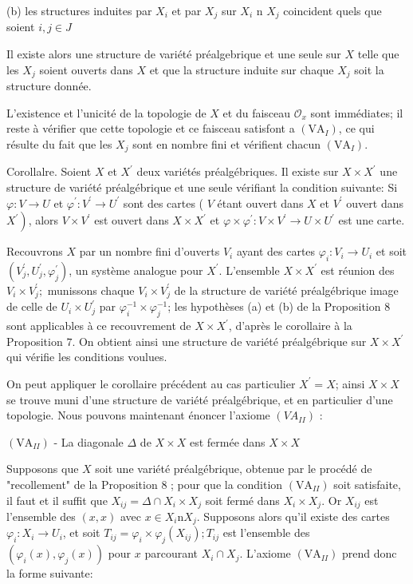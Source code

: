 (b) les structures induites par $X_{i}$ et par $X_{j}$ sur $X_{i}$ n $X_{j}$ coincident quels que soient $i, j \in J$

Il existe alors une structure de variété préalgebrique et une seule sur $X$ telle que les $X_{j}$ soient ouverts dans $X$ et que la structure induite sur chaque $X_{j}$ soit la structure donnée.

L'existence et l'unicité de la topologie de $X$ et du faisceau $\mathcal{O}_{x}$ sont immédiates; il reste à vérifier que cette topologie et ce faisceau satisfont a $\left(\mathrm{VA}_{I}\right)$, ce qui résulte du fait que les $X_{j}$ sont en nombre fini et vérifient chacun $\left(\mathrm{VA}_{I}\right)$.

Corollalre. Soient $X$ et $X^{\prime}$ deux variétés préalgébriques. Il existe sur $X \times X^{\prime}$ une structure de variété préalgébrique et une seule vérifiant la condition suivante: Si $\varphi: V \rightarrow U$ et $\varphi^{\prime}: V^{\prime} \rightarrow U^{\prime}$ sont des cartes ( $V$ étant ouvert dans $X$ et $V^{\prime}$ ouvert dans $\left.X^{\prime}\right)$, alors $V \times V^{\prime}$ est ouvert dans $X \times X^{\prime}$ et $\varphi \times \varphi^{\prime}: V \times V^{\prime} \rightarrow U \times U^{\prime}$ est une carte.

Recouvrons $X$ par un nombre fini d'ouverts $V_{i}$ ayant des cartes $\varphi_{i}: V_{i} \rightarrow U_{i}$ et soit $\left(V_{j}^{\prime}, U_{j}^{\prime}, \varphi_{j}^{\prime}\right)$, un système analogue pour $X^{\prime} .$ L'ensemble $X \times X^{\prime}$ est réunion des $V_{i} \times V_{j}^{\prime} ;$ munissons chaque $V_{i} \times V_{j}^{\prime}$ de la structure de variété préalgébrique image de celle de $U_{i} \times U_{j}^{\prime}$ par $\varphi_{i}^{-1} \times \varphi_{j}^{-1}$; les hypothèses (a) et (b) de la Proposition 8 sont applicables à ce recouvrement de $X \times X^{\prime}$, d'après le corollaire à la Proposition $7 .$ On obtient ainsi une structure de variété préalgébrique sur $X \times X^{\prime}$ qui vérifie les conditions voulues.

On peut appliquer le corollaire précédent au cas particulier $X^{\prime}=X$; ainsi $X \times X$ se trouve muni d'une structure de variété préalgébrique, et en particulier d'une topologie. Nous pouvons maintenant énoncer l'axiome $\left(V A_{I I}\right)$ :

$\left(\mathrm{VA}_{I I}\right)$ - La diagonale $\Delta$ de $X \times X$ est fermée dans $X \times X$

Supposons que $X$ soit une variété préalgébrique, obtenue par le procédé de "recollement" de la Proposition 8 ; pour que la condition $\left(\mathrm{VA}_{I I}\right)$ soit satisfaite, il faut et il suffit que $X_{i j}=\Delta \cap X_{i} \times X_{j}$ soit fermé dans $X_{i} \times X_{j} .$ Or $X_{i j}$ est l'ensemble des $(x, x)$ avec $x \in X_{i} \mathrm{n} X_{j} .$ Supposons alors qu'il existe des cartes $\varphi_{i}: X_{i} \rightarrow U_{i}$, et soit $T_{i j}=\varphi_{i} \times \varphi_{j}\left(X_{i j}\right) ; T_{i j}$ est l'ensemble des $\left(\varphi_{i}(x), \varphi_{j}(x)\right)$ pour $x$ parcourant $X_{i} \cap X_{j} .$ L'axiome $\left(\mathrm{VA}_{I I}\right)$ prend donc la forme suivante:

